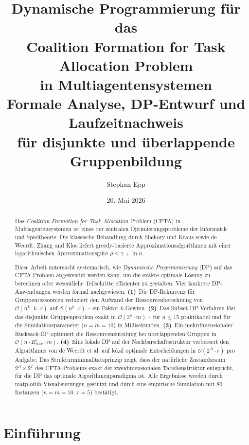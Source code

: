 \documentclass[a4paper,12pt]{article}
\title{\textbf{Dynamische Programmierung f\"{u}r das}\\
\textbf{Coalition Formation for Task Allocation Problem}\\
\textbf{in Multiagentensystemen}\\[6pt]
\large Formale Analyse, DP-Entwurf und Laufzeitnachweis\\
f\"{u}r disjunkte und \"{u}berlappende Gruppenbildung}
\author{Stephan Epp}
\date{20. Mai 2026}
\theoremstyle{definition}
\begin{document}
\maketitle

\begin{abstract}
\noindent
Das \emph{Coalition Formation for Task Allocation}-Problem (CFTA) in
Multiagentensystemen ist eines der zentralen Optimierungsprobleme der
Informatik und Spieltheorie. Die klassische Behandlung durch Shehory
und Kraus \cite{sk98} sowie de Weerdt, Zhang und Klos \cite{dwzk07}
liefert greedy-basierte Approximationsalgorithmen mit einer
logarithmischen Approximationsg\"{u}te $\rho \leq \gamma + \ln n$.

Diese Arbeit untersucht systematisch, wie \emph{Dynamische Programmierung}
(DP) auf das CFTA-Problem angewendet werden kann, um die exakte optimale
L\"{o}sung zu berechnen oder wesentliche Teilschritte effizienter zu gestalten.
Vier konkrete DP-Anwendungen werden formal nachgewiesen:
\textbf{(1)}~Die DP-Rekurrenz f\"{u}r Gruppenressourcen reduziert den Aufwand
der Ressourcenberechnung von $\mathcal{O}(n^k \cdot k \cdot r)$ auf
$\mathcal{O}(n^k \cdot r)$ -- ein Faktor-$k$-Gewinn.
\textbf{(2)}~Das Subset-DP-Verfahren l\"{o}st das disjunkte Gruppenproblem
exakt in $\mathcal{O}(3^n \cdot m)$ -- f\"{u}r $n \leq 15$ praktikabel und
f\"{u}r die Simulationsparameter ($n = m = 10$) in Millisekunden.
\textbf{(3)}~Ein mehrdimensionaler Rucksack-DP optimiert die
Ressourcenzuteilung bei \"{u}berlappenden Gruppen in
$\mathcal{O}(n \cdot B_{\max}^r \cdot m)$.
\textbf{(4)}~Eine lokale DP auf der Nachbarschaftsstruktur verbessert den
Algorithmus von de Weerdt et al. auf lokal optimale Entscheidungen in
$\mathcal{O}(2^\Delta \cdot r)$ pro Aufgabe.
Das Strukturminimalit\"{a}tsprinzip zeigt, dass der nat\"{u}rliche
Zustandsraum $2^A \times 2^T$ des CFTA-Problems exakt der
zweidimensionalen Tabellenstruktur entspricht, f\"{u}r die DP das
optimale Algorithmenparadigma ist.
Alle Ergebnisse werden durch matplotlib-Visualisierungen gest\"{u}tzt und
durch eine empirische Simulation mit 80 Instanzen ($n = m = 10$, $r = 5$)
best\"{a}tigt.
\end{abstract}

\tableofcontents
\newpage

\section{Einf\"{u}hrung}
\end{document}
